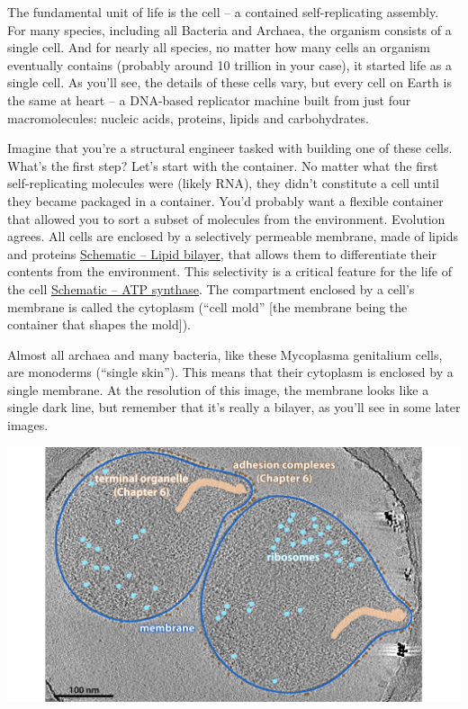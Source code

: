 \documentclass[]{tufte-book}
\begin{document}
The fundamental unit of life is the cell -- a contained self-replicating
assembly. For many species, including all Bacteria and Archaea, the
organism consists of a single cell. And for nearly all species, no
matter how many cells an organism eventually contains (probably around
10 trillion in your case), it started life as a single cell. As you'll
see, the details of these cells vary, but every cell on Earth is the
same at heart -- a DNA-based replicator machine built from just four
macromolecules: nucleic acids, proteins, lipids and carbohydrates.

Imagine that you're a structural engineer tasked with building one of
these cells. What's the first step? Let's start with the container. No
matter what the first self-replicating molecules were (likely RNA), they
didn't constitute a cell until they became packaged in a container.
You'd probably want a flexible container that allowed you to sort a
subset of molecules from the environment. Evolution agrees. All cells
are enclosed by a selectively permeable membrane, made of lipids and
proteins \protect\hyperlink{fig:2-1-1}{Schematic -- Lipid bilayer}, that
allows them to differentiate their contents from the environment. This
selectivity is a critical feature for the life of the cell
\protect\hyperlink{fig:2-1-2}{Schematic -- ATP synthase}. The
compartment enclosed by a cell's membrane is called the cytoplasm
(``cell mold'' {[}the membrane being the container that shapes the
mold{]}).

Almost all archaea and many bacteria, like these Mycoplasma genitalium
cells, are monoderms (``single skin''). This means that their cytoplasm
is enclosed by a single membrane. At the resolution of this image, the
membrane looks like a single dark line, but remember that it's really a
bilayer, as you'll see in some later images.

\includegraphics{img/02_static/2_1_Mgenitalium}
\end{document}
